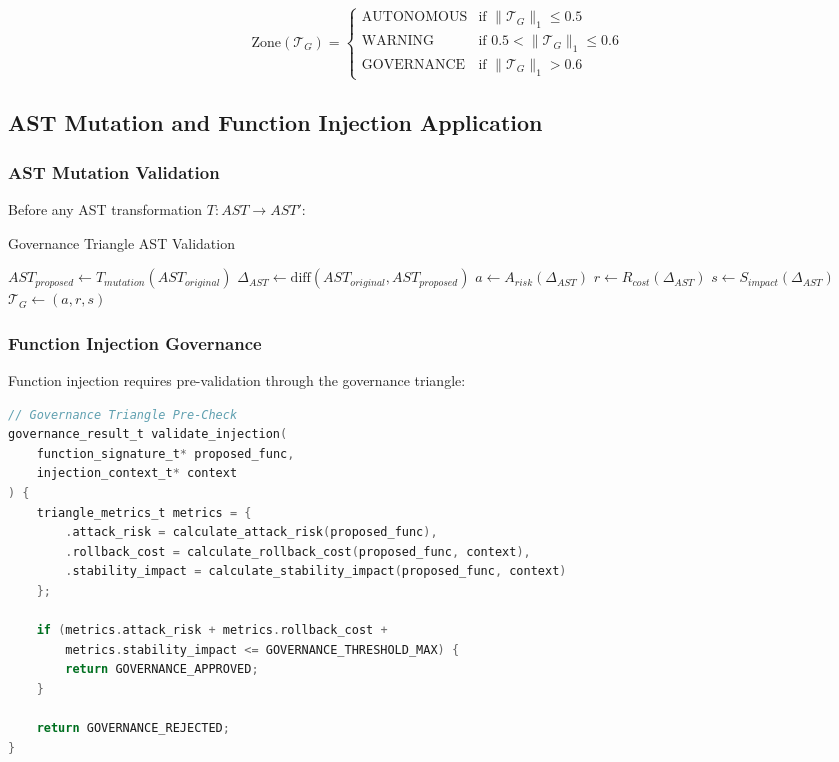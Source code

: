 \begin{equation}
\text{Zone}(\mathcal{T}_G) = \begin{cases}
\text{AUTONOMOUS} & \text{if } \|\mathcal{T}_G\|_1 \leq 0.5 \\
\text{WARNING} & \text{if } 0.5 < \|\mathcal{T}_G\|_1 \leq 0.6 \\
\text{GOVERNANCE} & \text{if } \|\mathcal{T}_G\|_1 > 0.6
\end{cases}
\end{equation}

\subsection{AST Mutation and Function Injection Application}

\subsubsection{AST Mutation Validation}

Before any AST transformation $T: AST \rightarrow AST'$:

\begin{algorithm}[H]
\caption{Governance Triangle AST Validation}
\begin{algorithmic}[1]
\State $AST_{proposed} \leftarrow T_{mutation}(AST_{original})$
\State $\Delta_{AST} \leftarrow \text{diff}(AST_{original}, AST_{proposed})$
\State $a \leftarrow A_{risk}(\Delta_{AST})$
\State $r \leftarrow R_{cost}(\Delta_{AST})$
\State $s \leftarrow S_{impact}(\Delta_{AST})$
\State $\mathcal{T}_G \leftarrow (a, r, s)$
    \State {}
\Else
    \State {}
\EndIf
\end{algorithmic}
\end{algorithm}

\subsubsection{Function Injection Governance}

Function injection requires pre-validation through the governance triangle:

\begin{lstlisting}[language=C, caption=Safe Function Injection Pattern]
// Governance Triangle Pre-Check
governance_result_t validate_injection(
    function_signature_t* proposed_func,
    injection_context_t* context
) {
    triangle_metrics_t metrics = {
        .attack_risk = calculate_attack_risk(proposed_func),
        .rollback_cost = calculate_rollback_cost(proposed_func, context),
        .stability_impact = calculate_stability_impact(proposed_func, context)
    };
    
    if (metrics.attack_risk + metrics.rollback_cost + 
        metrics.stability_impact <= GOVERNANCE_THRESHOLD_MAX) {
        return GOVERNANCE_APPROVED;
    }
    
    return GOVERNANCE_REJECTED;
}
\end{lstlisting}

